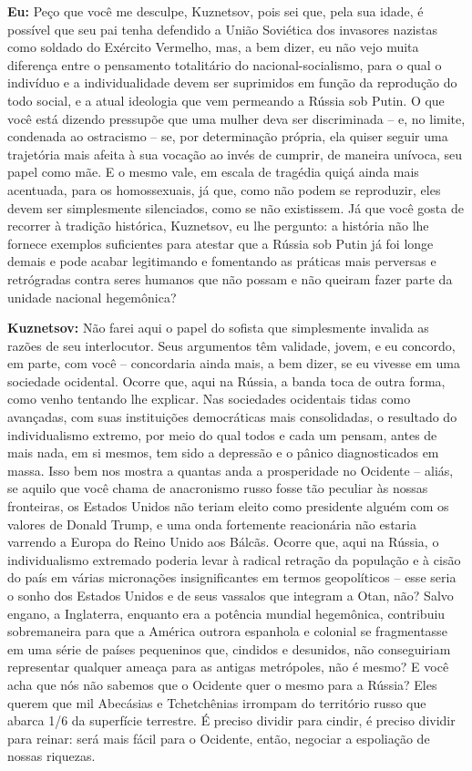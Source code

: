 \textbf{Eu:} Peço que você me desculpe, Kuznetsov, pois sei que, pela
sua idade, é possível que seu pai tenha defendido a União Soviética dos
invasores nazistas como soldado do Exército Vermelho, mas, a bem dizer,
eu não vejo muita diferença entre o pensamento totalitário do
nacional-socialismo, para o qual o indivíduo e a individualidade devem
ser suprimidos em função da reprodução do todo social, e a atual
ideologia que vem permeando a Rússia sob Putin. O que você está dizendo
pressupõe que uma mulher deva ser discriminada -- e, no limite,
condenada ao ostracismo -- se, por determinação própria, ela quiser
seguir uma trajetória mais afeita à sua vocação ao invés de cumprir, de
maneira unívoca, seu papel como mãe. E o mesmo vale, em escala de
tragédia quiçá ainda mais acentuada, para os homossexuais, já que, como
não podem se reproduzir, eles devem ser simplesmente silenciados, como
se não existissem. Já que você gosta de recorrer à tradição histórica,
Kuznetsov, eu lhe pergunto: a história não lhe fornece exemplos
suficientes para atestar que a Rússia sob Putin já foi longe demais e
pode acabar legitimando e fomentando as práticas mais perversas e
retrógradas contra seres humanos que não possam e não queiram fazer
parte da unidade nacional hegemônica?

\textbf{Kuznetsov:} Não farei aqui o papel do sofista que simplesmente
invalida as razões de seu interlocutor. Seus argumentos têm validade,
jovem, e eu concordo, em parte, com você -- concordaria ainda mais, a
bem dizer, se eu vivesse em uma sociedade ocidental. Ocorre que, aqui na
Rússia, a banda toca de outra forma, como venho tentando lhe explicar.
Nas sociedades ocidentais tidas como avançadas, com suas instituições
democráticas mais consolidadas, o resultado do individualismo extremo,
por meio do qual todos e cada um pensam, antes de mais nada, em si
mesmos, tem sido a depressão e o pânico diagnosticados em massa. Isso
bem nos mostra a quantas anda a prosperidade no Ocidente -- aliás, se
aquilo que você chama de anacronismo russo fosse tão peculiar às nossas
fronteiras, os Estados Unidos não teriam eleito como presidente alguém
com os valores de Donald Trump, e uma onda fortemente reacionária não
estaria varrendo a Europa do Reino Unido aos Bálcãs. Ocorre que, aqui na
Rússia, o individualismo extremado poderia levar à radical retração da
população e à cisão do país em várias micronações insignificantes em
termos geopolíticos -- esse seria o sonho dos Estados Unidos e de seus
vassalos que integram a Otan, não? Salvo engano, a Inglaterra, enquanto
era a potência mundial hegemônica, contribuiu sobremaneira para que a
América outrora espanhola e colonial se fragmentasse em uma série de
países pequeninos que, cindidos e desunidos, não conseguiriam
representar qualquer ameaça para as antigas metrópoles, não é mesmo? E
você acha que nós não sabemos que o Ocidente quer o mesmo para a Rússia?
Eles querem que mil Abecásias e Tchetchênias irrompam do território
russo que abarca 1/6 da superfície terrestre. É preciso dividir para
cindir, é preciso dividir para reinar: será mais fácil para o Ocidente,
então, negociar a espoliação de nossas riquezas.

